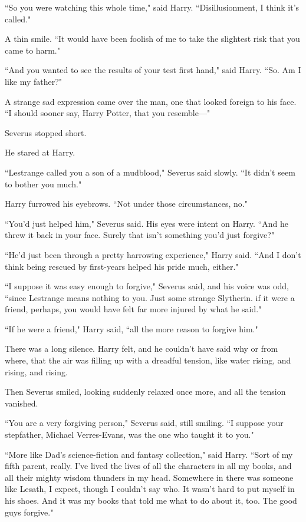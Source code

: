 ``So you were watching this whole time," said Harry. ``Disillusionment, I think it's called."

A thin smile. ``It would have been foolish of me to take the slightest risk that you came to harm."

``And you wanted to see the results of your test first hand," said Harry. ``So. Am I like my father?"

A strange sad expression came over the man, one that looked foreign to his face. ``I should sooner say, Harry Potter, that you resemble—"

Severus stopped short.

He stared at Harry.

``Lestrange called you a son of a mudblood," Severus said slowly. ``It didn't seem to bother you much."

Harry furrowed his eyebrows. ``Not under those circumstances, no."

``You'd just helped him," Severus said. His eyes were intent on Harry. ``And he threw it back in your face. Surely that isn't something you'd just forgive?"

``He'd just been through a pretty harrowing experience," Harry said. ``And I don't think being rescued by first-years helped his pride much, either."

``I suppose it was easy enough to forgive," Severus said, and his voice was odd, ``since Lestrange means nothing to you. Just some strange Slytherin. if it were a friend, perhaps, you would have felt far more injured by what he said."

``If he were a friend," Harry said, ``all the more reason to forgive him."

There was a long silence. Harry felt, and he couldn't have said why or from where, that the air was filling up with a dreadful tension, like water rising, and rising, and rising.

Then Severus smiled, looking suddenly relaxed once more, and all the tension vanished.

``You are a very forgiving person," Severus said, still smiling. ``I suppose your stepfather, Michael Verres-Evans, was the one who taught it to you."

``More like Dad's science-fiction and fantasy collection," said Harry. ``Sort of my fifth parent, really. I've lived the lives of all the characters in all my books, and all their mighty wisdom thunders in my head. Somewhere in there was someone like Lesath, I expect, though I couldn't say who. It wasn't hard to put myself in his shoes. And it was my books that told me what to do about it, too. The good guys forgive."

